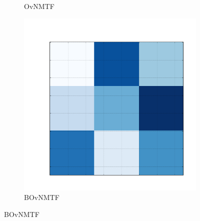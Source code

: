 \documentclass[10pt]{beamer}
\begin{document}
\begin{frame}
\begin{figure}[H]
\begin{subfigure}[b]{0.13\textwidth}
          \caption*{OvNMTF}
      \end{subfigure}
      \begin{subfigure}[b]{0.13\textwidth}
          \includegraphics[width=\textwidth]{img/c-reconstruction-binovnmtf.png}
          \caption*{BOvNMTF}
      \end{subfigure}
  \end{figure}
\end{frame}
\end{document}
